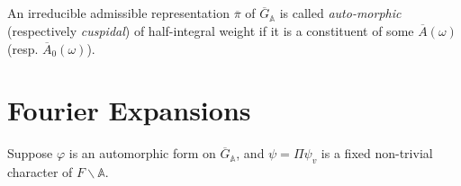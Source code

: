 \subsection{}\label{art1-sec9.4}
An irreducible admissible representation $\overline{\pi}$ of $\overline{G}_{\mathbb{A}}$ is called {\em auto-morphic} (respectively {\em cuspidal}) of half-integral weight if it is a constituent of some $\overline{A}(\omega)$ (resp. $\overline{A}_{0}(\omega)$).

\section{Fourier Expansions}\label{art1-sec10}

Suppose $\varphi$ is an automorphic form on $\overline{G}_{\mathbb{A}}$, and $\psi=\Pi \psi_{v}$ is a fixed non-trivial character of $F\backslash \mathbb{A}$.

